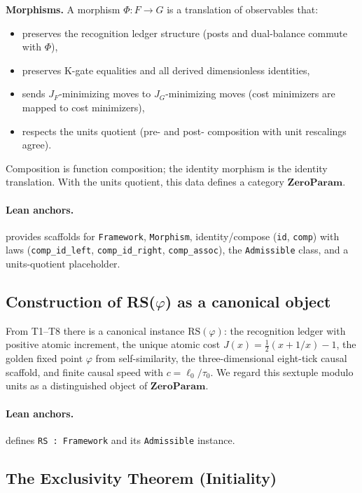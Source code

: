 \documentclass[11pt]{article}
\begin{document}
\textbf{Morphisms.} A morphism \(\Phi\colon F\to G\) is a translation of observables that:
\begin{itemize}
  \item preserves the recognition ledger structure (posts and dual\mbox{-}balance commute with \(\Phi\)),
  \item preserves K\mbox{-}gate equalities and all derived dimensionless identities,
  \item sends \(J_F\)\mbox{-}minimizing moves to \(J_G\)\mbox{-}minimizing moves (cost minimizers are mapped to cost minimizers),
  \item respects the units quotient (pre\mbox{-} and post\mbox{-} composition with unit rescalings agree).
\end{itemize}
Composition is function composition; the identity morphism is the identity translation. With the units quotient, this data defines a category \(\mathbf{ZeroParam}\).

\paragraph{Lean anchors.}  provides scaffolds for \texttt{Framework}, \texttt{Morphism}, identity/compose (\texttt{id}, \texttt{comp}) with laws (\texttt{comp\_id\_left}, \texttt{comp\_id\_right}, \texttt{comp\_assoc}), the \texttt{Admissible} class, and a units\mbox{-}quotient placeholder.

\subsection{Construction of RS(\(\varphi\)) as a canonical object}
From T1--T8 there is a canonical instance \(\mathrm{RS}(\varphi)\): the recognition ledger with positive atomic increment, the unique atomic cost \(J(x)=\tfrac{1}{2}(x+1/x)-1\), the golden fixed point \(\varphi\) from self\mbox{-}similarity, the three\mbox{-}dimensional eight\mbox{-}tick causal scaffold, and finite causal speed with \(c=\ell_0/\tau_0\). We regard this sextuple modulo units as a distinguished object of \(\mathbf{ZeroParam}\).

\paragraph{Lean anchors.}  defines \texttt{RS : Framework} and its \texttt{Admissible} instance.

\subsection{The Exclusivity Theorem (Initiality)}
\end{document}
